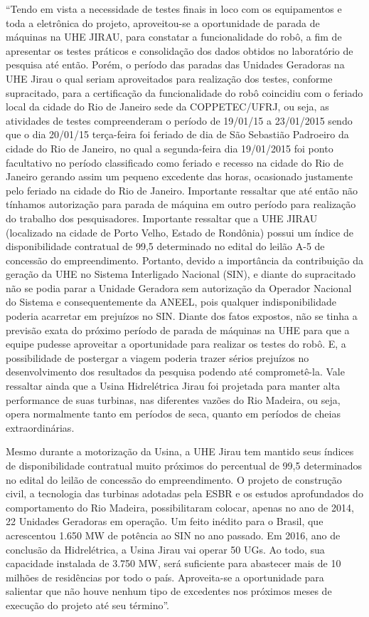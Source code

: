 “Tendo em vista a necessidade de testes finais in loco com os equipamentos e
toda a eletrônica do projeto, aproveitou-se a oportunidade de parada de máquinas
na UHE JIRAU, para constatar a funcionalidade do robô, a fim de apresentar os
testes práticos e consolidação dos dados obtidos no laboratório de pesquisa até
então.
Porém, o período das paradas das Unidades Geradoras na UHE Jirau o qual
seriam aproveitados para realização dos testes, conforme supracitado, para a
certificação da funcionalidade do robô coincidiu com o feriado local da cidade do
Rio de Janeiro sede da COPPETEC/UFRJ, ou seja, as atividades de testes
compreenderam o período de 19/01/15 a 23/01/2015 sendo que o dia 20/01/15
terça-feira foi feriado de dia de São Sebastião Padroeiro da cidade do Rio de
Janeiro, no qual a segunda-feira dia 19/01/2015 foi ponto facultativo no período
classificado como feriado e recesso na cidade do Rio de Janeiro gerando assim
um pequeno excedente das horas, ocasionado justamente pelo feriado na cidade
do Rio de Janeiro. Importante ressaltar que até então não tínhamos autorização
para parada de máquina em outro período para realização do trabalho dos
pesquisadores.
Importante ressaltar que a UHE JIRAU (localizado na cidade de Porto Velho,
Estado de Rondônia) possui um índice de disponibilidade contratual de 99,5%
determinado no edital do leilão A-5 de concessão do empreendimento. Portanto,
devido a importância da contribuição da geração da UHE no Sistema Interligado
Nacional (SIN), e diante do supracitado não se podia parar a Unidade Geradora
sem autorização da Operador Nacional do Sistema e consequentemente da
ANEEL, pois qualquer indisponibilidade poderia acarretar em prejuízos no SIN.
Diante dos fatos expostos, não se tinha a previsão exata do próximo período de
parada de máquinas na UHE para que a equipe pudesse aproveitar a oportunidade
para realizar os testes do robô. E, a possibilidade de postergar a viagem poderia
trazer sérios prejuízos no desenvolvimento dos resultados da pesquisa podendo
até comprometê-la.
Vale ressaltar ainda que a Usina Hidrelétrica Jirau foi projetada para manter alta
performance de suas turbinas, nas diferentes vazões do Rio Madeira, ou seja,
opera normalmente tanto em períodos de seca, quanto em períodos de cheias
extraordinárias.

Mesmo durante a motorização da Usina, a UHE Jirau tem mantido seus índices
de disponibilidade contratual muito próximos do percentual de 99,5%
determinados no edital do leilão de concessão do empreendimento. O projeto de
construção civil, a tecnologia das turbinas adotadas pela ESBR e os estudos
aprofundados do comportamento do Rio Madeira, possibilitaram colocar, apenas
no ano de 2014, 22 Unidades Geradoras em operação. Um feito inédito para o
Brasil, que acrescentou 1.650 MW de potência ao SIN no ano passado.
Em 2016, ano de conclusão da Hidrelétrica, a Usina Jirau vai operar 50 UGs. Ao
todo, sua capacidade instalada de 3.750 MW, será suficiente para abastecer mais
de 10 milhões de residências por todo o país.
Aproveita-se a oportunidade para salientar que não houve nenhum tipo de
excedentes nos próximos meses de execução do projeto até seu término”.

